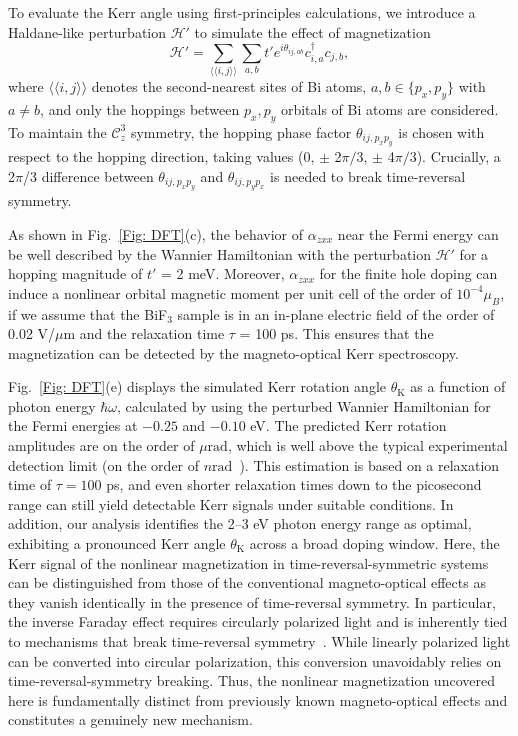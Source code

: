 \documentclass[aps,prl,twocolumn,amsmath,amssymb,showpacs, superscriptaddress,notitlepage,longbibliography,10pt]{revtex4-1}
\begin{document}
To evaluate the Kerr angle using first-principles calculations, we introduce a Haldane-like perturbation $\mathcal{H}'$ to simulate the effect of magnetization
\begin{equation}\label{Eq: Hp}
\mathcal{H}'=\sum_{\langle\langle i,j\rangle\rangle}  \sum_{a,b}  t' e^{i \theta_{ij,ab}} c_{i,a}^\dagger c_{j,b},
\end{equation}
where $\langle\langle i,j\rangle\rangle$ denotes the second-nearest sites of Bi atoms, $a,b \in \{p_x,p_y\}$ with $a\neq b$, and only the hoppings between $p_x, p_y$ orbitals of Bi atoms are considered. To maintain the $\mathcal{C}_z^3$ symmetry, the hopping phase factor $\theta_{ij, p_xp_y}$  is chosen with respect to the hopping direction, taking values (0, $\pm$ 2$\pi/3$, $\pm$ 4$\pi/3$). Crucially, a 2$\pi$/3 difference between $\theta_{ij, p_xp_y}$ and $\theta_{ij, p_yp_x}$ is needed to break time-reversal symmetry.

As shown in Fig.~\ref{Fig: DFT}(c), the behavior of $\alpha_{zxx}$ near the Fermi energy can be well described by the Wannier Hamiltonian with the  perturbation  $\mathcal{H}'$ for a  hopping magnitude of $t'$ = 2 meV. Moreover, $\alpha_{zxx}$ for the finite hole doping can induce a nonlinear orbital magnetic moment per unit cell of the order of $10^{-4} \mu_B$, if we assume that the BiF$_3$ sample is in an in-plane electric field of the order of 0.02 V/$\mu$m and the relaxation time $\tau$ = 100 ps. This ensures that the magnetization can be detected by the magneto-optical Kerr spectroscopy.

Fig.~\ref{Fig: DFT}(e) displays the simulated Kerr rotation angle $\theta_{\text{K}}$ as a function of photon energy $\hbar\omega$, calculated by using the perturbed Wannier Hamiltonian for the Fermi energies at $-0.25$ and $-0.10$ eV. The predicted Kerr rotation amplitudes are on the order of $\mu\mathrm{rad}$, which is well above the typical experimental detection limit (on the order of $n\mathrm{rad}$~\cite{Choi23nature}). This estimation is based on a relaxation time of $\tau = 100$ ps, and even shorter relaxation times down to the picosecond range can still yield detectable Kerr signals under suitable conditions. In addition, our analysis identifies the 2–3 eV photon energy range as optimal, exhibiting a pronounced Kerr angle $\theta_\text{K}$ across a broad doping window. Here, the Kerr signal of the nonlinear magnetization in time-reversal-symmetric systems can be distinguished from those of the conventional magneto-optical effects as they vanish identically in the presence of time-reversal symmetry. In particular, the inverse Faraday effect requires circularly polarized light and is inherently tied to mechanisms that break time-reversal symmetry~\cite{Stefan11prb,Kruglyak12prb,Oppeneer14prb,Ulrich21prb}. While linearly polarized light can be converted into circular polarization, this conversion unavoidably relies on time-reversal-symmetry breaking. Thus, the nonlinear magnetization uncovered here is fundamentally distinct from previously known magneto-optical effects and constitutes a genuinely new mechanism.
\end{document}
